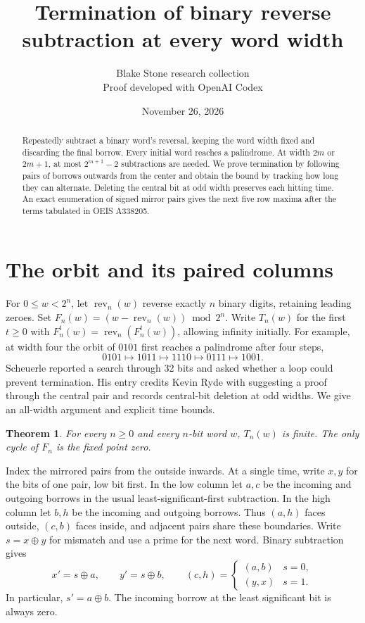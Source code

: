 \documentclass[11pt]{article}
\title{Termination of binary reverse subtraction at every word width}
\author{Blake Stone research collection\\\small Proof developed with OpenAI Codex}
\date{November 26, 2026}
\newtheorem{theorem}{Theorem}
\newcommand{\rev}{\operatorname{rev}}
\begin{document}
\maketitle
\begin{abstract}
Repeatedly subtract a binary word's reversal, keeping the word width fixed and discarding the final borrow. Every initial word reaches a palindrome. At width $2m$ or $2m+1$, at most $2^{m+1}-2$ subtractions are needed. We prove termination by following pairs of borrows outwards from the center and obtain the bound by tracking how long they can alternate. Deleting the central bit at odd width preserves each hitting time. An exact enumeration of signed mirror pairs gives the next five row maxima after the terms tabulated in OEIS A338205.
\end{abstract}

\section{The orbit and its paired columns}
For $0\le w<2^n$, let $\rev_n(w)$ reverse exactly $n$ binary digits, retaining leading zeroes. Set $F_n(w)=(w-\rev_n(w))\bmod 2^n$. Write $T_n(w)$ for the first $t\ge0$ with $F_n^t(w)=\rev_n(F_n^t(w))$, allowing infinity initially. For example, at width four the orbit of $0101$ first reaches a palindrome after four steps,
\[
0101\longmapsto1011\longmapsto1110\longmapsto0111\longmapsto1001.
\]
Scheuerle reported a search through 32 bits and asked whether a loop could prevent termination. His entry credits Kevin Ryde with suggesting a proof through the central pair and records central-bit deletion at odd widths. We give an all-width argument and explicit time bounds.\ \cite{tri,max}

\begin{theorem}\label{thm:main}
For every $n\ge0$ and every $n$-bit word $w$, $T_n(w)$ is finite. The only cycle of $F_n$ is the fixed point zero.
\end{theorem}

Index the mirrored pairs from the outside inwards. At a single time, write $x,y$ for the bits of one pair, low bit first. In the low column let $a,c$ be the incoming and outgoing borrows in the usual least-significant-first subtraction. In the high column let $b,h$ be the incoming and outgoing borrows. Thus $(a,h)$ faces outside, $(c,b)$ faces inside, and adjacent pairs share these boundaries. Write $s=x\mathbin\oplus y$ for mismatch and use a prime for the next word. Binary subtraction gives
\begin{equation}\label{eq:borrow}
 x'=s\oplus a,\qquad y'=s\oplus b,\qquad
 (c,h)=\begin{cases}(a,b)&s=0,\\(y,x)&s=1.\end{cases}
\end{equation}
In particular, $s'=a\oplus b$. The incoming borrow at the least significant bit is always zero.
\end{document}
